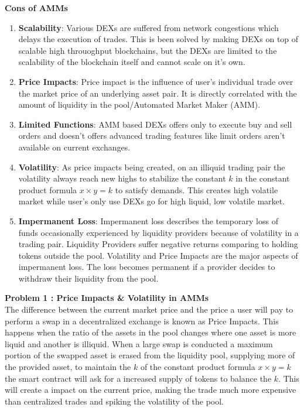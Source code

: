 \documentclass[10pt]{article}
\begin{document}
\textbf{Cons of AMMs}
\begin{enumerate}[leftmargin=+0.2in]
\item \textbf{Scalability}: Various DEXs are suffered from network congestions which delays the execution of trades. This is been solved by making DEXs on top of scalable high throuoghput blockchains, but the DEXs are limited to the scalability of the blockchain itself and cannot scale on it's own.
\item \textbf{Price Impacts}: Price impact is the influence of user's individual trade over the market price of an underlying asset pair. It is directly correlated with the amount of liquidity in the pool/Automated Market Maker (AMM).
\item \textbf{Limited Functions}: AMM based DEXs offers only to execute buy and sell orders and doesn't offers advanced trading features like limit orders aren't available on current exchanges.
\item \textbf{Volatility}: As price impacts being created, on an illiquid trading pair the volatility always reach new highs to stabilize the constant $k$ in the constant product formula $x \times  y=k$ to satisfy demands. This creates high volatile market while user's only use DEXs go for high liquid, low volatile market.
\item \textbf{Impermanent Loss}: Impermanent loss describes the temporary loss of funds occasionally experienced by liquidity providers because of volatility in a trading pair. Liquidity Providers suffer negative returns comparing to holding tokens outside the pool. Volatility and Price Impacts are the major aspects of impermanent loss. The loss becomes permanent if a provider decides to withdraw their liquidity from the pool.
\end{enumerate}

\textbf{Problem 1 : Price Impacts \& Volatility in AMMs}\\

The difference between the current market price and the price a user will pay to perform a swap in a decentralized exchange is known as Price Impacts. This happens when the ratio of the assets in the pool changes where one asset is more liquid and another is illiquid. When a large swap is conducted a maximum portion of the swapped asset is erased from the liquidity pool, supplying more of the provided asset, to maintain the $k$ of the constant product formula $x \times y=k$ the smart contract will ask for a increased supply of tokens to balance the $k$. This will create a impact on the current price, making the trade much more expensive than centralized trades and spiking the volatility of the pool.\\
\end{document}
